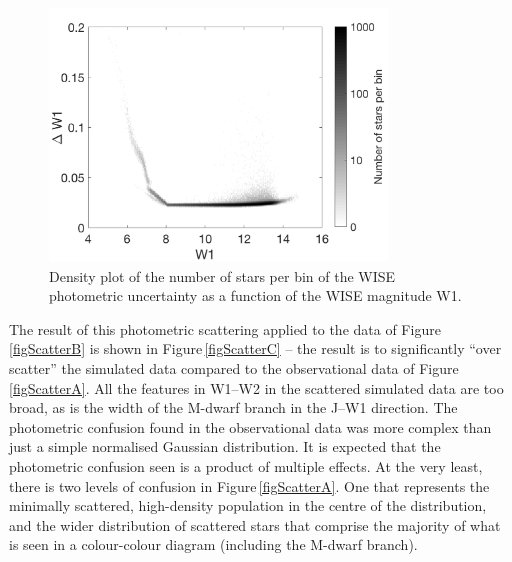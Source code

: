 \begin{figure}[!ht]
	\centering
    \includegraphics[width=0.8\textwidth]{deltaW1.pdf}
    \caption{Density plot of the number of stars per bin of the WISE photometric uncertainty as a function of the WISE magnitude W1.}
    \label{figDelta}
\end{figure}

The result of this photometric scattering applied to the data of Figure\,\ref{figScatterB} is shown in Figure\,\ref{figScatterC} -- the result is to significantly ``over scatter'' the simulated data compared to the observational data of Figure\,\ref{figScatterA}. All the features in W1--W2 in the scattered simulated data are too broad, as is the width of the M-dwarf branch in the J--W1 direction. The photometric confusion found in the observational data was more complex than just a simple normalised Gaussian distribution. It is expected that the photometric confusion seen is a product of multiple effects. At the very least, there is two levels of confusion in Figure\,\ref{figScatterA}. One that represents the minimally scattered, high-density population in the centre of the distribution, and the wider distribution of scattered stars that comprise the majority of what is seen in a colour-colour diagram (including the M-dwarf branch). \\ 

